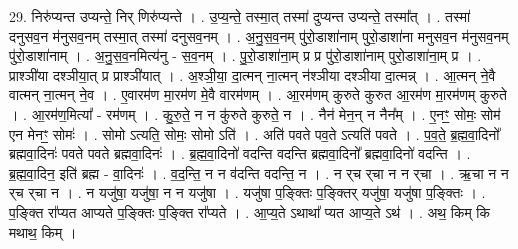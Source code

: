 \documentclass[17pt]{extarticle}
\begin{document}
29. निरु॑प्यन्त उप्यन्ते॒ निर् णिरु॑प्यन्ते । . उ॒प्य॒न्ते॒ तस्मा॒त् तस्मा॑ दुप्यन्त उप्यन्ते॒ तस्मा᳚त् । . तस्मा॑ दनुसव॒न म॑नुसव॒नम् तस्मा॒त् तस्मा॑ दनुसव॒नम् । . अ॒नु॒स॒व॒नम् पु॑रो॒डाशा॑नाम् पुरो॒डाशा॑ना मनुसव॒न म॑नुसव॒नम् पु॑रो॒डाशा॑नाम् । . अ॒नु॒स॒व॒नमित्य॑नु - स॒व॒नम् । . पु॒रो॒डाशा॑ना॒म् प्र प्र पु॑रो॒डाशा॑नाम् पुरो॒डाशा॑ना॒म् प्र । . प्राश्ञी॑या दश्ञीया॒त् प्र प्राश्ञी॑यात् । . अ॒श्ञी॒या॒ दा॒त्मन् ना॒त्मन् न॑श्ञीया दश्ञीया दा॒त्मन्न् । . आ॒त्मन् ने॒वै वात्मन् ना॒त्मन् ने॒व । . ए॒वारम॑ण मा॒रम॑ण मे॒वै वारम॑णम् । . आ॒रम॑णम् कुरुते कुरुत आ॒रम॑ण मा॒रम॑णम् कुरुते । . आ॒रम॑ण॒मित्या᳚ - रम॑णम् । . कु॒रु॒ते॒ न न कु॑रुते कुरुते॒ न । . नैन॑ मेन॒न् न नैन᳚म् । . ए॒नꣳ॒॒ सोमः॒ सोम॑ एन मेनꣳ॒॒ सोमः॑ । . सोमो ऽत्यति॒ सोमः॒ सोमो ऽति॑ । . अति॑ पवते पव॒ते ऽत्यति॑ पवते । . प॒व॒ते॒ ब्र॒ह्म॒वा॒दिनो᳚ ब्रह्मवा॒दिनः॑ पवते पवते ब्रह्मवा॒दिनः॑ । . ब्र॒ह्म॒वा॒दिनो॑ वदन्ति वदन्ति ब्रह्मवा॒दिनो᳚ ब्रह्मवा॒दिनो॑ वदन्ति । . ब्र॒ह्म॒वा॒दिन॒ इति॑ ब्रह्म - वा॒दिनः॑ । . व॒द॒न्ति॒ न न व॑दन्ति वदन्ति॒ न । . न र्‌च र्‌चा न न र्‌चा । . ऋ॒चा न न र्‌च र्‌चा न । . न यजु॑षा॒ यजु॑षा॒ न न यजु॑षा । . यजु॑षा प॒ङ्क्तिः प॒ङ्क्तिर् यजु॑षा॒ यजु॑षा प॒ङ्क्तिः । . प॒ङ्क्ति रा᳚प्यत आप्यते प॒ङ्क्तिः प॒ङ्क्ति रा᳚प्यते । . आ॒प्य॒ते ऽथाथा᳚ प्यत आप्य॒ते ऽथ॑ । . अथ॒ किम् कि मथाथ॒ किम् । \newline
\end{document}
